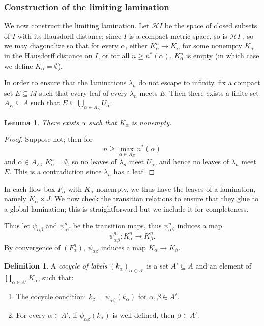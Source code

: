 \documentclass[reqno,11pt]{amsart}
\newcommand{\Hypspace}{\mathscr H}
\newcommand{\dfn}[1]{\emph{#1}\index{#1}}
\newtheorem{lemma}[theorem]{Lemma}
\theoremstyle{definition}
\newtheorem{definition}[theorem]{Definition}
\numberwithin{equation}{section}
\begin{document}
\subsubsection{Construction of the limiting lamination}
We now construct the limiting lamination.
Let $\Hypspace I$ be the space of closed subsets of $I$ with its Hausdorff distance; since $I$ is a compact metric space, so is $\Hypspace I$ \cite[Theorem 4.17]{nadler2017continuum}, so we may diagonalize so that for every $\alpha$, either $K^n_\alpha \to K_\alpha$ for some nonempty $K_\alpha$ in the Hausdorff distance on $I$, or for all $n \geq n^*(\alpha)$, $K_\alpha^n$ is empty (in which case we define $K_\alpha = \emptyset$).

In order to ensure that the laminations $\lambda_n$ do not escape to infinity, fix a compact set $E \subseteq M$ such that every leaf of every $\lambda_n$ meets $E$.
Then there exists a finite set $A_E \subseteq A$ such that $E \subseteq \bigcup_{\alpha \in A_E} U_\alpha$.

\begin{lemma}\label{label sets are nonempty}
	There exists $\alpha$ such that $K_\alpha$ is nonempty.
\end{lemma}
\begin{proof}
	Suppose not; then for
	$$n \geq \max_{\alpha \in A_E} n^*(\alpha)$$
	and $\alpha \in A_E$, $K_\alpha^n = \emptyset$, so no leaves of $\lambda_n$ meet $U_\alpha$, and hence no leaves of $\lambda_n$ meet $E$.
	This is a contradiction since $\lambda_n$ has a leaf.
\end{proof}

In each flow box $F_\alpha$ with $K_\alpha$ nonempty, we thus have the leaves of a lamination, namely $K_\alpha \times J$.
We now check the transition relations to ensure that they glue to a global lamination; this is straightforward but we include it for completeness.

Thus let $\psi_{\alpha \beta}$ and $\psi_{\alpha \beta}^n$ be the transition maps, thus $\psi_{\alpha \beta}^n$ induces a map
$$\psi_{\alpha \beta}^n: K_\alpha^n \to K_\beta^n.$$
By convergence of $(F_\alpha^n)$, $\psi_{\alpha \beta}$ induces a map $K_\alpha \to K_\beta$.

\begin{definition}
	A \dfn{cocycle of labels} $(k_\alpha)_{\alpha \in A'}$ is a set $A' \subseteq A$ and an element of $\prod_{\alpha \in A'} K_\alpha$, such that:
\begin{enumerate}
	\item The cocycle condition: $k_\beta = \psi_{\alpha \beta}(k_\alpha)$ for $\alpha, \beta \in A'$.
	\item For every $\alpha \in A'$, if $\psi_{\alpha \beta}(k_\alpha)$ is well-defined, then $\beta \in A'$.
\end{enumerate}
\end{definition}
\end{document}
